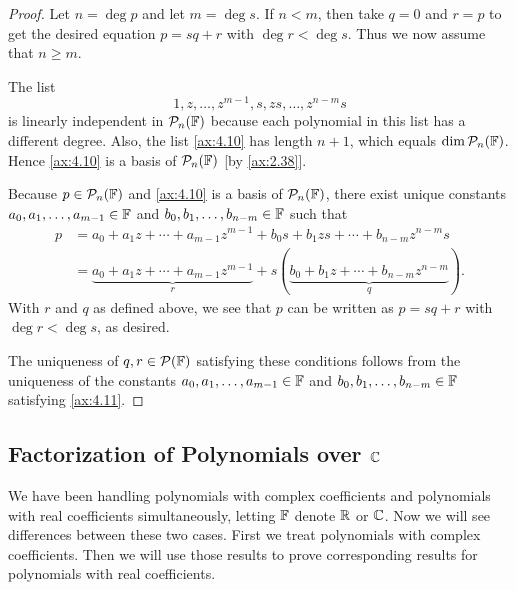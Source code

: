 \begin{proof}
Let $n=\deg p$ and let $m=\deg s$. If $n<m$, then take $q=0$ and $r=p$ to get
the desired equation $p=sq+r$ with $\deg r<\deg s$. Thus we now assume that
$n\ge m$.

The list
\begin{equation*}
1,z,\dots,z^{m-1},s,zs,\dots,z^{n-m}s
\tag*{\thetheorem}\label{ax:4.10}
\end{equation*}
is linearly independent in $\mathcal{P}_n(\mathbb{F})$ because each polynomial in this list
has a different degree. Also, the list \ref{ax:4.10} has length $n+1$, which
equals $\operatorname{dim}\mathcal{P}_n(\mathbb{F})$. Hence \ref{ax:4.10} is a basis of $\mathcal{P}_n(\mathbb{F})$
[by \ref{ax:2.38}].

Because $p\in\mathcal{P}_n(\mathbb{F})$ and \ref{ax:4.10} is a basis of $\mathcal{P}_n(\mathbb{F})$, there
exist unique constants $a_0,a_1,\dots,a_{m-1}\in\mathbb{F}$ and
$b_0,b_1,\dots,b_{n-m}\in\mathbb{F}$ such that
\begin{align*}
p &= a_0+a_1z+\cdots+a_{m-1}z^{m-1}+b_0s+b_1zs+\cdots+b_{n-m}z^{n-m}s
  \tag*{\thetheorem}\label{ax:4.11}\\
  &= \underbrace{a_0+a_1z+\cdots+a_{m-1}z^{m-1}}_{r}
     +s(\underbrace{b_0+b_1z+\cdots+b_{n-m}z^{n-m}}_{q}).
\end{align*}
With $r$ and $q$ as defined above, we see that $p$ can be written as
$p=sq+r$ with $\deg r<\deg s$, as desired.

The uniqueness of $q,r\in\mathcal{P}(\mathbb{F})$ satisfying these conditions follows from
the uniqueness of the constants $a_0,a_1,\dots,a_{m-1}\in\mathbb{F}$ and
$b_0,b_1,\dots,b_{n-m}\in\mathbb{F}$ satisfying \ref{ax:4.11}.
\end{proof}

\subsection{\texorpdfstring{Factorization of Polynomials over $\mathbb{C}$}%
{Factorization of Polynomials over C}}

%
We have been handling polynomials with complex coefficients and polynomials
with real coefficients simultaneously, letting $\mathbb{F}$ denote $\mathbb{R}$ or $\mathbb{C}$. Now we
will see differences between these two cases. First we treat polynomials with
complex coefficients. Then we will use those results to prove corresponding
results for polynomials with real coefficients.

